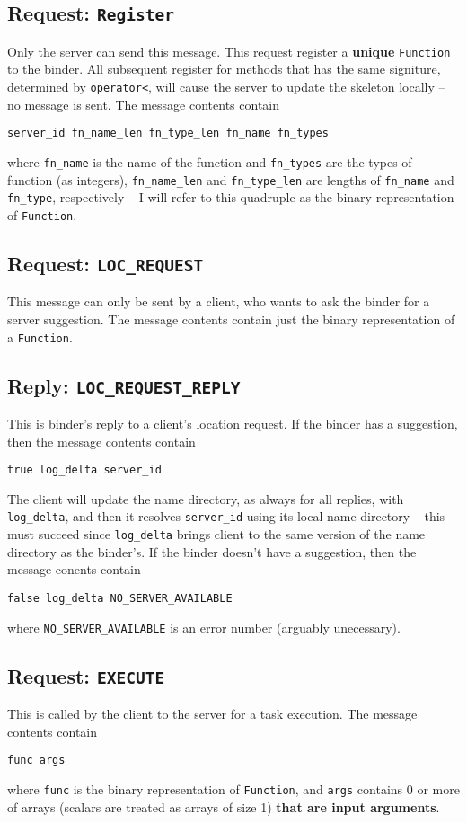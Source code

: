 \subsection{Request: \tt Register}
Only the server can send this message.
This request register a {\bf unique} {\tt Function} to the binder.
All subsequent register for methods that has the same signiture, determined by {\tt operator<}, will cause the server to update the skeleton locally -- no message is sent.
The message contents contain
\begin{verbatim}
server_id fn_name_len fn_type_len fn_name fn_types
\end{verbatim}
where {\tt fn\_name} is the name of the function and {\tt fn\_types} are the types of function (as integers), {\tt fn\_name\_len} and {\tt fn\_type\_len} are lengths of {\tt fn\_name} and {\tt fn\_type}, respectively -- I will refer to this quadruple as the binary representation of {\tt Function}.

\subsection{Request: \tt LOC\_REQUEST}
This message can only be sent by a client, who wants to ask the binder for a server suggestion.
The message contents contain just the binary representation of a {\tt Function}.

\subsection{Reply: \tt LOC\_REQUEST\_REPLY}
This is binder's reply to a client's location request.
If the binder has a suggestion, then the message contents contain
\begin{verbatim}
true log_delta server_id
\end{verbatim}
The client will update the name directory, as always for all replies, with {\tt log\_delta}, and then it resolves {\tt server\_id} using its local name directory -- this must succeed since {\tt log\_delta} brings client to the same version of the name directory as the binder's.
If the binder doesn't have a suggestion, then the message conents contain
\begin{verbatim}
false log_delta NO_SERVER_AVAILABLE
\end{verbatim}
where {\tt NO\_SERVER\_AVAILABLE} is an error number (arguably unecessary).

\subsection{Request: \tt EXECUTE}
This is called by the client to the server for a task execution.
The message contents contain
\begin{verbatim}
func args
\end{verbatim}
where {\tt func} is the binary representation of {\tt Function}, and {\tt args} contains 0 or more of arrays (scalars are treated as arrays of size 1) {\bf that are input arguments}.

